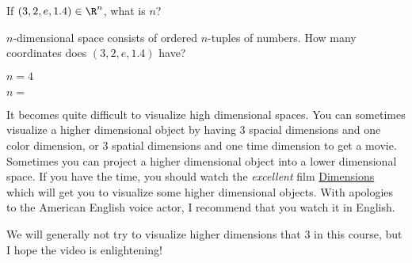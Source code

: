 \documentclass{ximera}
\begin{document}

\begin{question}
	If $(3,2,e,1.4) \in \R^n$, what is $n$?
	\begin{solution}
		\begin{hint}
		$n$-dimensional space consists of ordered $n$-tuples of numbers.  How many coordinates does $(3,2,e,1.4)$ have?
		\end{hint}
		\begin{hint}
			$n=4$
		\end{hint}
	$n = $
	\end{solution}
\end{question}

It becomes quite difficult to visualize high dimensional spaces.  
You can sometimes visualize a higher dimensional object by having $3$ spacial dimensions and one color dimension, or $3$ spatial dimensions and one time 
dimension to get a movie.  Sometimes you can project a higher dimensional object into a lower dimensional space.  If you have the time, you should watch the 
\textit{excellent} film \href{http://www.dimensions-math.org/}{Dimensions}  which will get you to visualize some higher dimensional objects.  
With apologies to the American English voice actor, I recommend that you watch it in English.

We will generally not try to visualize higher dimensions that $3$ in this course, but I hope the video is enlightening!



\end{document}
